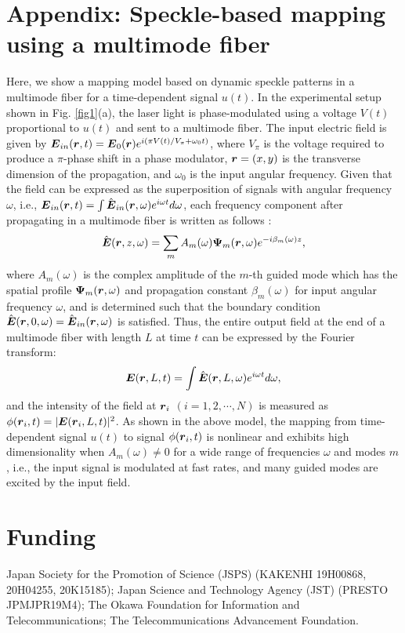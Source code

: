 \documentclass{article}
\newcommand{\rr}{\mbox{\boldmath $r$}}
\newcommand{\EE}{\mbox{\boldmath $E$}}
\newcommand{\PPsi}{\mbox{\boldmath $\Psi$}}
\begin{document}
\section*{Appendix: Speckle-based mapping using a multimode fiber
 \label{appendixA}}
Here, we show a mapping model based on dynamic speckle patterns in a
multimode fiber for a time-dependent signal $u(t)$.
%
In the experimental setup shown in Fig. \ref{fig1}(a), 
the laser light is phase-modulated using a voltage $V(t)$
proportional to $u(t)$ and sent to a multimode fiber.
% 
The input electric field is given by $\EE_{in}(\rr,t) =
\EE_0(\rr)e^{i(\pi V(t)/V_{\pi}+\omega_0 t)}$, 
where $V_{\pi}$ is the voltage required to produce a $\pi$-phase shift in a phase modulator, 
$\rr = (x,y)$ is the transverse dimension of the propagation, and
$\omega_0$ is the input angular frequency. 
%
Given that the field can be expressed as the superposition of signals
with angular frequency $\omega$, i.e., 
$\EE_{in}(\rr,t) = \int \hat{\EE}_{in}(\rr,\omega)e^{i\omega t}d\omega$, 
each frequency component after propagating in a multimode fiber 
is written as follows \cite{Redding2013}: 
%
\begin{align}
\hat{\EE}(\rr,z,\omega) = \sum_m A_m(\omega)\PPsi_{m}(\rr,\omega)
e^{-i\beta_m(\omega)z},
\end{align}
%
where 
$A_m(\omega)$ is the complex amplitude of the $m$-th guided mode which has the
spatial profile $\PPsi_m(\rr,\omega)$ and propagation constant
$\beta_m(\omega)$ 
for input angular frequency $\omega$, and is determined such that the boundary
condition $\hat{\EE}(\rr,0,\omega) = \hat{\EE}_{in}(\rr,\omega)$ is
satisfied.
%
Thus, the entire output field at the end of a multimode fiber with length $L$ 
at time $t$ can be expressed by the Fourier transform: 
\begin{align}
    \EE(\rr,L,t) = \int \hat{\EE}(\rr,L,\omega)e^{i\omega t}d\omega,
\end{align}
and the intensity of the field at $\rr_i$ $(i=1,2,\cdots, N)$ is measured 
as $\phi(\rr_i,t)=|\EE(\rr_i,L,t)|^2$. 
%
As shown in the above model, the mapping from time-dependent signal
$u(t)$ to signal $\phi(\rr_i,t)$ is nonlinear  
and exhibits high dimensionality when $A_m(\omega)\ne 0$ for a
wide range of frequencies $\omega$ and modes $m$, i.e., the input signal
is modulated at fast rates, and many guided modes are excited by the
input field. 

\section*{Funding}
Japan Society for the Promotion of Science (JSPS) (KAKENHI 19H00868,
20H04255, 20K15185);
Japan Science and Technology Agency (JST) (PRESTO JPMJPR19M4);
The Okawa Foundation for Information and Telecommunications;
The Telecommunications Advancement Foundation.
\end{document}
